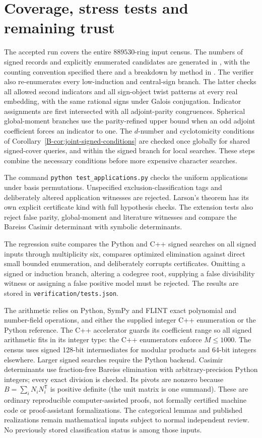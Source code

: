 \documentclass[11pt]{article}
\begin{document}
\section{Coverage, stress tests and remaining trust}
The accepted run covers the entire $889530$-ring input census. The
numbers of signed records and explicitly enumerated candidates are
generated in , with the counting
convention specified there and a breakdown by method in
. The verifier also re-enumerates every
low-induction and central-sign branch. The latter checks all allowed
second indicators and all sign-object twist patterns at every real
embedding, with the same rational signs under Galois conjugation.
Indicator assignments are first intersected with all adjoint-parity
congruences. Spherical global-moment branches use the parity-refined
upper bound when an odd adjoint coefficient forces an indicator to one.
The $d$-number and cyclotomicity conditions of
Corollary~\ref{B-cor:joint-signed-conditions} are checked once globally
for shared signed-cover queries, and within the signed branch for
local searches. These steps combine
the necessary conditions before more expensive character searches.

The command \texttt{python test\_applications.py} checks the uniform
applications under basis permutations. Unspecified exclusion-classification tags and deliberately altered
application witnesses are rejected. Larson's theorem has its own explicit
certificate kind with full hypothesis checks. The extension tests also
reject false parity, global-moment and literature witnesses and compare the
Bareiss Casimir determinant with symbolic determinants.

The regression suite compares the Python and C++ signed searches on all
signed inputs through multiplicity six, compares optimized elimination
against direct small bounded enumeration, and deliberately corrupts
certificates. Omitting a signed or induction branch, altering a codegree
root, supplying a false divisibility witness or assigning a false positive
model must be rejected. The results are stored in
\texttt{verification/tests.json}.

The arithmetic relies on Python, SymPy and FLINT exact polynomial and
number-field operations, and either the supplied integer C++ enumeration
or the Python reference. The C++ accelerator guards its coefficient range so all signed
arithmetic fits in its integer type: the C++ enumerators enforce
$M\leq1000$. The census uses signed 128-bit intermediates for modular
products and 64-bit integers elsewhere. Larger signed searches require
the Python backend. Casimir determinants use fraction-free Bareiss
elimination with arbitrary-precision Python integers; every exact
division is checked. Its pivots are nonzero because
$B=\sum_iN_iN_i^{\mathsf T}$ is positive definite (the unit matrix
is one summand). These are ordinary reproducible computer-assisted proofs, not
formally certified machine code or proof-assistant formalizations. The
categorical lemmas and published realizations remain mathematical inputs
subject to normal independent review. No previously stored classification
status is among those inputs.
\end{document}
